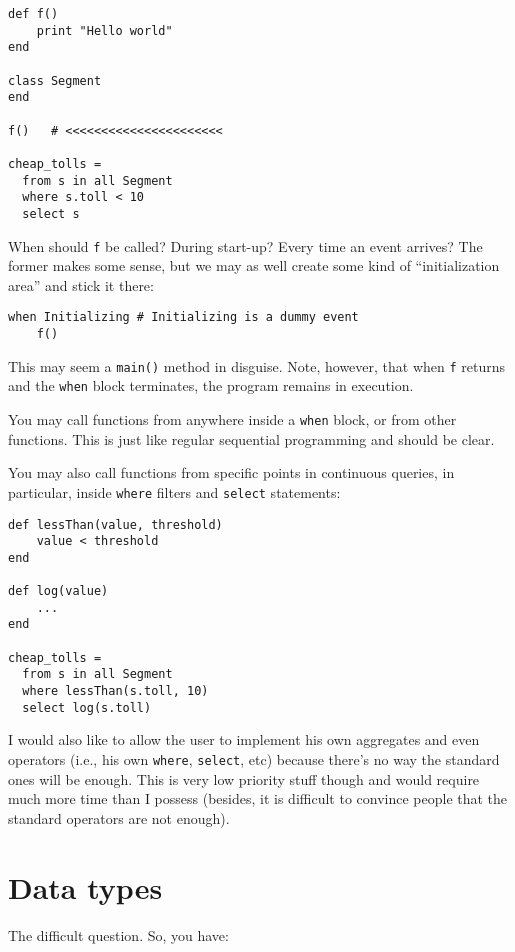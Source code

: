 \documentclass{report}
\begin{document}
\begin{verbatim}
def f()
    print "Hello world"
end

class Segment
end

f()   # <<<<<<<<<<<<<<<<<<<<<<

cheap_tolls =
  from s in all Segment
  where s.toll < 10
  select s
\end{verbatim}

When should \verb=f= be called? During start-up? Every time an event
arrives? The former makes some sense, but we may as well create some
kind of ``initialization area'' and stick it there:

\begin{verbatim}
when Initializing # Initializing is a dummy event
    f()
\end{verbatim}

This may seem a \verb=main()= method in disguise. Note, however, that
when \verb=f= returns and the \verb=when= block terminates, the
program remains in execution.

You may call functions from anywhere inside a \verb=when= block, or
from other functions. This is just like regular sequential programming
and should be clear.

You may also call functions from specific points in continuous
queries, in particular, inside \verb=where= filters and \verb=select=
statements:

\begin{verbatim}
def lessThan(value, threshold)
    value < threshold
end

def log(value)
    ...
end

cheap_tolls =
  from s in all Segment
  where lessThan(s.toll, 10)
  select log(s.toll)
\end{verbatim}

I would also like to allow the user to implement his own aggregates
and even operators (i.e., his own \verb=where=, \verb=select=, etc)
because there's no way the standard ones will be enough. This is very
low priority stuff though and would require much more time than I
possess (besides, it is difficult to convince people that the standard
operators are not enough).

\chapter{Data types}

The difficult question. So, you have:
\end{document}
